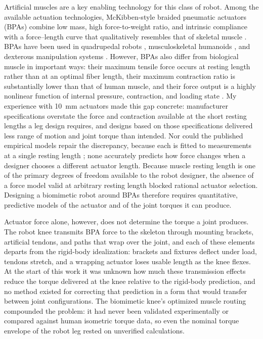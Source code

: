 Artificial muscles are a key enabling technology for this class of robot. Among the available actuation technologies, McKibben-style braided pneumatic actuators (BPAs) combine low mass, high force-to-weight ratio, and intrinsic compliance with a force--length curve that qualitatively resembles that of skeletal muscle \citep{liang_comparative_2020, hunt_modeling_2017}. BPAs have been used in quadrupedal robots \citep{aschenbeck_design_2006, hunt_modeling_2017, scharzenberger_design_2019}, musculoskeletal humanoids \citep{asano_design_2017, hitzmann_anthropomorphic_2018}, and dexterous manipulation systems \citep{chen_realizing_2019}. However, BPAs also differ from biological muscle in important ways: their maximum tensile force occurs at resting length rather than at an optimal fiber length, their maximum contraction ratio is substantially lower than that of human muscle, and their force output is a highly nonlinear function of internal pressure, contraction, and loading state \citep{hunt_modeling_2017, sarosi_comparative_2017, liang_comparative_2020}. My experience with \qty{10}{\mm} actuators made this gap concrete: manufacturer specifications overstate the force and contraction available at the short resting lengths a leg design requires, and designs based on those specifications delivered less range of motion and joint torque than intended. Nor could the published empirical models repair the discrepancy, because each is fitted to measurements at a single resting length \citep{sarosi_comparative_2017, martens_modeling_2017, hunt_modeling_2017}; none accurately predicts how force changes when a designer chooses a different actuator length. Because muscle resting length is one of the primary degrees of freedom available to the robot designer, the absence of a force model valid at arbitrary resting length blocked rational actuator selection. Designing a biomimetic robot around BPAs therefore requires quantitative, predictive models of the actuator and of the joint torques it can produce.

Actuator force alone, however, does not determine the torque a joint produces. The robot knee transmits BPA force to the skeleton through mounting brackets, artificial tendons, and paths that wrap over the joint, and each of these elements departs from the rigid-body idealization: brackets and fixtures deflect under load, tendons stretch, and a wrapping actuator loses usable length as the knee flexes. At the start of this work it was unknown how much these transmission effects reduce the torque delivered at the knee relative to the rigid-body prediction, and no method existed for correcting that prediction in a form that would transfer between joint configurations. The biomimetic knee's optimized muscle routing \citep{morrow_optimization_2020} compounded the problem: it had never been validated experimentally or compared against human isometric torque data, so even the nominal torque envelope of the robot leg rested on unverified calculations.

